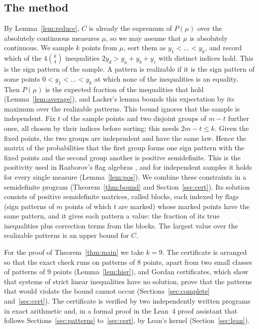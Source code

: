 \documentclass[11pt]{amsart}
\theoremstyle{definition}
\theoremstyle{remark}
\numberwithin{equation}{section}
\begin{document}
\subsection*{The method}
By Lemma~\ref{lem:reduce}, $C$ is already the supremum of $P(\mu)$ over the absolutely continuous measures $\mu$, so we may assume that $\mu$ is absolutely continuous. We sample $k$ points from $\mu$, sort them as $y_1<\dots<y_k$, and record which of the $4\binom k4$ inequalities $2y_d>y_a+y_b+y_c$ with distinct indices hold. This is the sign pattern of the sample. A pattern is realizable if it is the sign pattern of some points $0<y_1<\dots<y_k$ at which none of the inequalities is an equality. Then $P(\mu)$ is the expected fraction of the inequalities that hold (Lemma~\ref{lem:average}), and Lacker's lemma bounds this expectation by its maximum over the realizable patterns. This bound ignores that the sample is independent. Fix $t$ of the sample points and two disjoint groups of $m-t$ further ones, all chosen by their indices before sorting; this needs $2m-t\le k$. Given the fixed points, the two groups are independent and have the same law. Hence the matrix of the probabilities that the first group forms one sign pattern with the fixed points and the second group another is positive semidefinite. This is the positivity used in Razborov's flag algebras \cite{Raz07}, and for independent samples it holds for every single measure (Lemma~\ref{lem:pos}). We combine these constraints in a semidefinite program (Theorem~\ref{thm:bound} and Section~\ref{sec:cert}). Its solution consists of positive semidefinite matrices, called blocks, each indexed by flags (sign patterns of $m$ points of which $t$ are marked) whose marked points have the same pattern, and it gives each pattern a value: the fraction of its true inequalities plus correction terms from the blocks. The largest value over the realizable patterns is an upper bound for $C$.

For the proof of Theorem~\ref{thm:main} we take $k=9$. The certificate is arranged so that the exact check runs on patterns of $8$ points, apart from two small classes of patterns of $9$ points (Lemma~\ref{lem:hier}), and Gordan certificates, which show that systems of strict linear inequalities have no solution, prove that the patterns that would violate the bound cannot occur (Sections~\ref{sec:complete} and~\ref{sec:cert}). The certificate is verified by two independently written programs in exact arithmetic and, in a formal proof in the Lean~4 proof assistant that follows Sections~\ref{sec:patterns} to~\ref{sec:cert}, by Lean's kernel (Section~\ref{sec:lean}).
\end{document}

